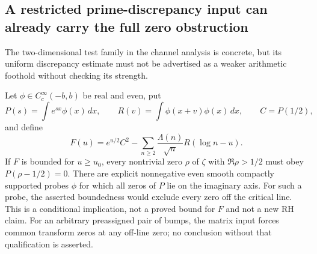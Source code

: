 \subsection*{A restricted prime-discrepancy input can already carry the full zero obstruction}
\label{sec:ns43-bump-strength}
The two-dimensional test family in the channel analysis is concrete,
but its uniform discrepancy estimate must not be advertised as a
weaker arithmetic foothold without checking its strength.

\begin{proposition}
\label{prop:ns43-bump-strength}
Let $\phi\in C_c^\infty(-b,b)$ be real and even, put
\[
 P(s)=\int e^{sx}\phi(x)\,dx,\qquad
 R(v)=\int\phi(x+v)\phi(x)\,dx,\qquad C=P(1/2),
\]
and define
\[
 F(u)=e^{u/2}C^2-
        \sum_{n\ge2}\frac{\Lambda(n)}{\sqrt n}R(\log n-u).
\]
If $F$ is bounded for $u\ge u_0$, every nontrivial zero $\rho$ of
$\zeta$ with $\Re\rho>1/2$ must obey $P(\rho-1/2)=0$.
There are explicit nonnegative even smooth compactly supported probes
$\phi$ for which all zeros of $P$ lie on the imaginary axis. For
such a probe, the asserted boundedness would exclude every zero off
the critical line. This is a conditional implication, not a proved
bound for $F$ and not a new RH claim. For an arbitrary preassigned
pair of bumps, the matrix input forces common transform zeros at
any off-line zero; no conclusion without that qualification is asserted.
\end{proposition}
